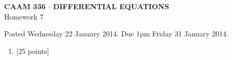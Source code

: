 \documentclass[10pt]{article}
\begin{document}
\vspace*{-5em}
\begin{center}
\large \textsf{\textbf{CAAM 336 $\cdot$ DIFFERENTIAL EQUATIONS}\\[0.5em]
Homework 7 }
\end{center}

Posted Wednesday 22 January 2014.  Due 1pm Friday 31 January 2014.

\begin{enumerate}\addtocounter{enumi}{6}
\item {[25 points]}\\  

\end{enumerate}
\end{document}
